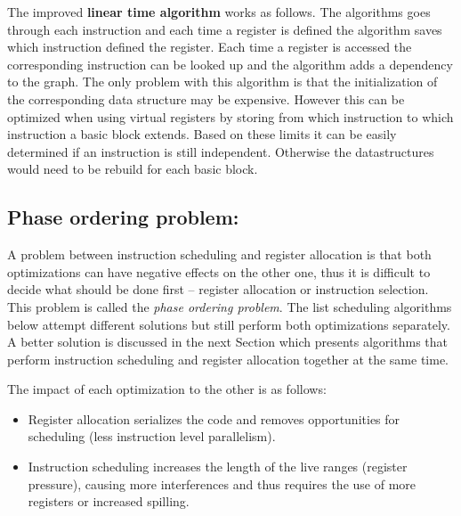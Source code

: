 \documentclass[a4paper,10pt]{article}
\begin{document}
The improved \textbf{linear time algorithm} works as follows. The algorithms goes through each instruction and each time a register is
defined the algorithm saves which instruction defined the register. Each time a register is accessed the corresponding instruction can be
looked up and the algorithm adds a dependency to the graph. The only problem with this algorithm is that the initialization of the
corresponding data structure may be expensive. However this can be optimized when using virtual registers by storing from which
instruction to which instruction a basic block extends. Based on these limits it can be easily determined if an instruction is still
independent. Otherwise the datastructures would need to be rebuild for each basic block.

\subsection{Phase ordering problem:}
A problem between instruction scheduling and register allocation is that both optimizations can have negative effects on the other one,
thus it is difficult to decide what should be done first -- register allocation or instruction selection. This problem is called the
\textit{phase ordering problem}. The list scheduling algorithms below attempt different solutions but still perform both optimizations
separately. A better solution is discussed in the next Section which presents algorithms that perform instruction scheduling and register
allocation together at the same time.

The impact of each optimization to the other is as follows:
\begin{itemize}
 \item Register allocation serializes the code and removes opportunities for scheduling (less instruction level parallelism).
 \item Instruction scheduling increases the length of the live ranges (register pressure), causing more interferences and thus requires
       the use of more registers or increased spilling.
\end{itemize}
\end{document}
